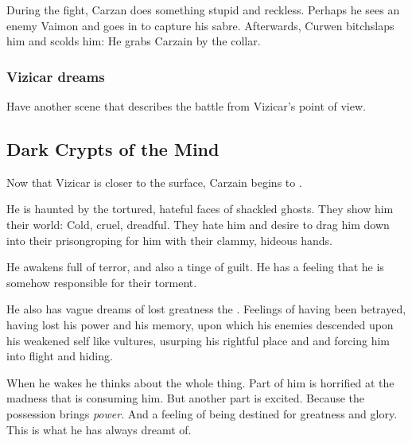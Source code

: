During the fight, Carzan does something stupid and reckless. 
Perhaps he sees an enemy Vaimon and goes in to capture his sabre. 
Afterwards, Curwen bitchslaps him and scolds him: 
He grabs Carzain by the collar. 





\subsubsection{Vizicar dreams}
Have another scene that describes the battle from Vizicar's point of view. 










\subsection{Dark Crypts of the Mind}
Now that Vizicar is closer to the surface, Carzain begins to . 

He is haunted by the tortured, hateful faces of shackled ghosts. They show him their world: Cold, cruel, dreadful. They hate him and desire to drag him down into their prison\dash groping for him with their clammy, hideous hands. 

He awakens full of terror, and also a tinge of guilt. He has a feeling that he is somehow responsible for their torment. 

He also has vague dreams of lost greatness\dash {} the . Feelings of having been betrayed, having lost his power and his memory, upon which his enemies descended upon his weakened self like vultures, usurping his rightful place and \honour and forcing him into flight and hiding. 

When he wakes he thinks about the whole thing. 
Part of him is horrified at the madness that is consuming him. 
But another part is excited. 
Because the possession brings \emph{power}. 
And a feeling of being destined for greatness and glory. 
This is what he has always dreamt of. 

